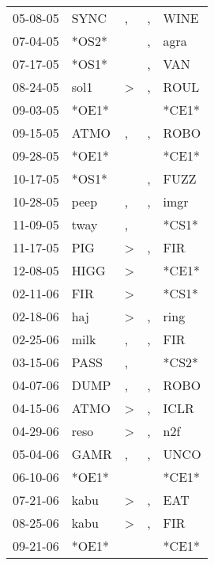 \begin{supertabular}{lllll}
 05-08-05 &   SYNC &                , &                , &   WINE \\
 07-04-05 &  *OS2* &                  &                , &   agra \\
 07-17-05 &  *OS1* &                  &                , &    VAN \\
 08-24-05 &   sol1 &     \textgreater &                , &   ROUL \\
 09-03-05 &  *OE1* &                  &                  &  *CE1* \\
 09-15-05 &   ATMO &                , &                , &   ROBO \\
 09-28-05 &  *OE1* &                  &                  &  *CE1* \\
 10-17-05 &  *OS1* &                  &                , &   FUZZ \\
 10-28-05 &   peep &                , &                , &   imgr \\
 11-09-05 &   tway &                , &                  &  *CS1* \\
 11-17-05 &    PIG &     \textgreater &                , &    FIR \\
 12-08-05 &   HIGG &     \textgreater &                  &  *CE1* \\
 02-11-06 &    FIR &     \textgreater &                  &  *CS1* \\
 02-18-06 &    haj &     \textgreater &                , &   ring \\
 02-25-06 &   milk &                , &                , &    FIR \\
 03-15-06 &   PASS &                , &                  &  *CS2* \\
 04-07-06 &   DUMP &                , &                , &   ROBO \\
 04-15-06 &   ATMO &     \textgreater &                , &   ICLR \\
 04-29-06 &   reso &     \textgreater &                , &    n2f \\
 05-04-06 &   GAMR &                , &                , &   UNCO \\
 06-10-06 &  *OE1* &                  &                  &  *CE1* \\
 07-21-06 &   kabu &     \textgreater &                , &    EAT \\
 08-25-06 &   kabu &     \textgreater &                , &    FIR \\
 09-21-06 &  *OE1* &                  &                  &  *CE1* \\

\end{supertabular}
